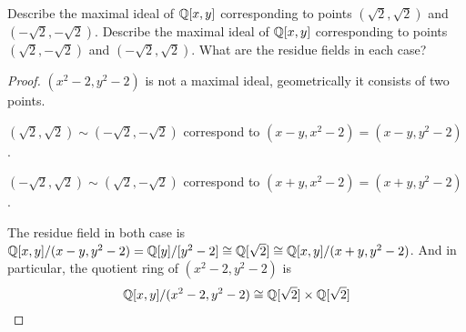 \begin{exr}
Describe the maximal ideal of  $\mathbb Q[x,y]$ corresponding to points $(\sqrt 2,\sqrt 2)$
and $(-\sqrt2, -\sqrt 2)$. Describe the maximal ideal of $\mathbb Q[x, y]$ corresponding to points $( \sqrt 2, -\sqrt 2)$ and $(-\sqrt2, \sqrt 2)$. What are the residue fields in each case?
\end{exr}
\begin{proof}
 $(x^2-2,y^2-2)$ is not a maximal ideal, geometrically it consists of two points.

$(\sqrt 2,\sqrt 2)\sim(-\sqrt 2,-\sqrt 2)$ correspond to $(x-y,x^2-2)=(x-y,y^2-2)$.

$(-\sqrt 2,\sqrt 2)\sim(\sqrt 2,-\sqrt 2)$ correspond to $(x+y,x^2-2)=(x+y,y^2-2)$.

The residue field in both case is $\mathbb Q[x,y]/(x-y,y^2-2)=\mathbb Q[y]/[y^2-2]\cong \mathbb Q[\sqrt 2]\cong \mathbb Q[x,y]/(x+y,y^2-2)$. And in particular, the quotient ring of $(x^2-2,y^2-2)$ is
$$
\mathbb Q[x,y]/(x^2-2,y^2-2)\cong \mathbb Q[\sqrt2]\times \mathbb Q[\sqrt 2]
$$

\end{proof}

